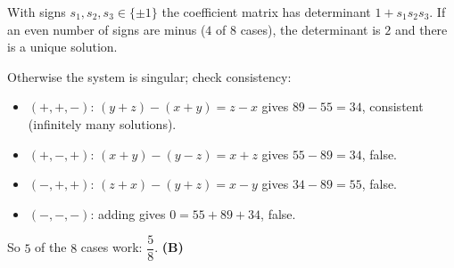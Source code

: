With signs $s_1,s_2,s_3\in\{\pm1\}$ the coefficient matrix has determinant $1+s_1s_2s_3$. If an even number of signs are minus ($4$ of $8$ cases), the determinant is $2$ and there is a unique solution.

Otherwise the system is singular; check consistency:
\begin{itemize}
\item $(+,+,-)$: $(y+z)-(x+y)=z-x$ gives $89-55=34$, consistent (infinitely many solutions).
\item $(+,-,+)$: $(x+y)-(y-z)=x+z$ gives $55-89=34$, false.
\item $(-,+,+)$: $(z+x)-(y+z)=x-y$ gives $34-89=55$, false.
\item $(-,-,-)$: adding gives $0=55+89+34$, false.
\end{itemize}
So $5$ of the $8$ cases work: $\dfrac58$. \textbf{(B)}
